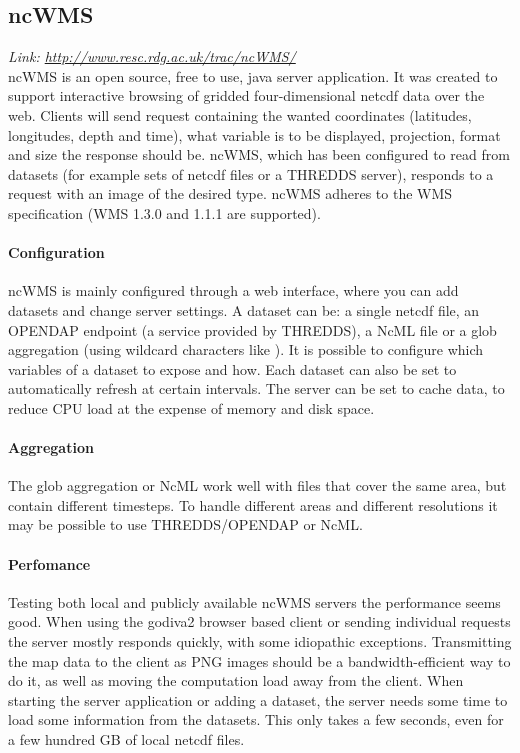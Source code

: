 \documentclass[11pt,a4paper,titlepage,oneside]{report}
\begin{document}
    \subsection{ncWMS}
  \emph{Link: \url{http://www.resc.rdg.ac.uk/trac/ncWMS/}} \\%
    ncWMS is an \gls{open source}, free to use, java server application. It was created to support interactive browsing of gridded four-dimensional \gls{netcdf} data over the web. Clients will send request containing the wanted coordinates (latitudes, longitudes, depth and time), what variable is to be displayed, projection, format and size the response should be. ncWMS, which has been configured to read from datasets (for example sets of \gls{netcdf} files or a \gls{THREDDS} server), responds to a request with an image of the desired type. ncWMS adheres to the \gls{WMS} specification (\gls{WMS} 1.3.0 and 1.1.1 are supported).
    \paragraph{Configuration}
    ncWMS is mainly configured through a web interface, where you can add datasets and change server settings. A dataset can be: a single \gls{netcdf} file, an \gls{OPENDAP} endpoint (a service provided by \gls{THREDDS}), a NcML file or a glob aggregation (using wildcard characters like ). It is possible to configure which variables of a dataset to expose and how. Each dataset can also be set to automatically refresh at certain intervals. The server can be set to cache data, to reduce \gls{CPU} load at the expense of memory and disk space.
    \paragraph{Aggregation}
    The glob aggregation or NcML work well with files that cover the same area, but contain different timesteps. To handle different areas and different resolutions it may be possible to use \gls{THREDDS}/\gls{OPENDAP} or NcML.
    \paragraph{Perfomance}
    Testing both local and publicly available ncWMS servers the performance seems good. When using the godiva2 browser based client or sending individual requests the server mostly responds quickly, with some idiopathic exceptions. Transmitting the map data to the client as \gls{PNG} images should be a bandwidth-efficient way to do it, as well as moving the computation load away from the client. When starting the server application or adding a dataset, the server needs some time to load some information from the datasets. This only takes a few seconds, even for a few hundred GB of local \gls{netcdf} files.
\end{document}
